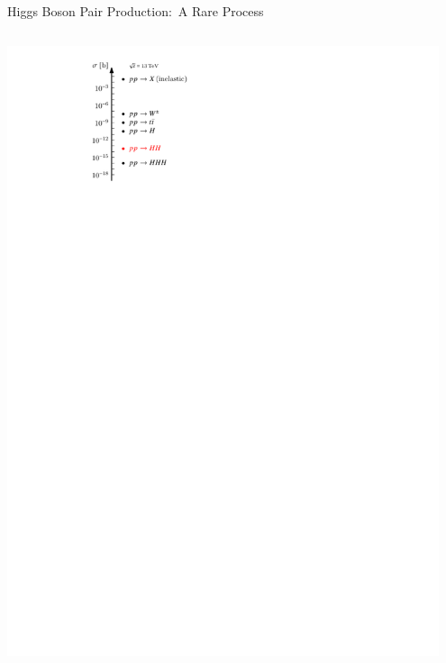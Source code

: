 \documentclass[11pt, xcolor={dvipsnames}, aspectratio=169, notes]{beamer}
\begin{document}
\begin{frame}{Higgs Boson Pair Production:\ A Rare Process}

  \begin{columns}
    \centering

    \vspace*{1em} \includegraphics[width=0.95\textwidth]{cross_section_figure}


\end{columns}
\end{frame}
\end{document}
